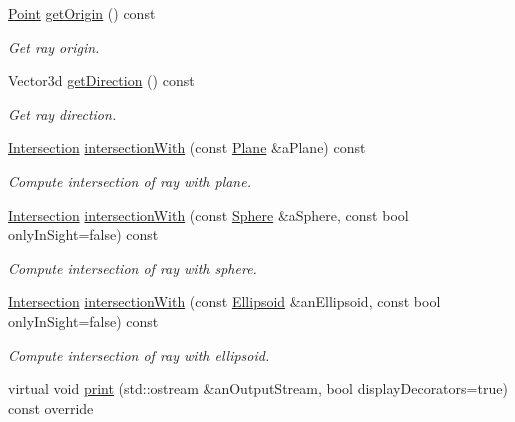 \begin{DoxyCompactItemize}
\hyperlink{classostk_1_1math_1_1geom_1_1d3_1_1objects_1_1_point}{Point} \hyperlink{classostk_1_1math_1_1geom_1_1d3_1_1objects_1_1_ray_a8c47fac4d487986b538b8168484527c2}{get\+Origin} () const
\begin{DoxyCompactList}\small\item\em Get ray origin. \end{DoxyCompactList}\item 
Vector3d \hyperlink{classostk_1_1math_1_1geom_1_1d3_1_1objects_1_1_ray_a986aa3d13740b411f72115503b1c9a72}{get\+Direction} () const
\begin{DoxyCompactList}\small\item\em Get ray direction. \end{DoxyCompactList}\item 
\hyperlink{classostk_1_1math_1_1geom_1_1d3_1_1_intersection}{Intersection} \hyperlink{classostk_1_1math_1_1geom_1_1d3_1_1objects_1_1_ray_aa4625c2dfe200ab9df245d2a4dc92f64}{intersection\+With} (const \hyperlink{classostk_1_1math_1_1geom_1_1d3_1_1objects_1_1_plane}{Plane} \&a\+Plane) const
\begin{DoxyCompactList}\small\item\em Compute intersection of ray with plane. \end{DoxyCompactList}\item 
\hyperlink{classostk_1_1math_1_1geom_1_1d3_1_1_intersection}{Intersection} \hyperlink{classostk_1_1math_1_1geom_1_1d3_1_1objects_1_1_ray_a41019b87b1221c265ce11974e6ddf7be}{intersection\+With} (const \hyperlink{classostk_1_1math_1_1geom_1_1d3_1_1objects_1_1_sphere}{Sphere} \&a\+Sphere, const bool only\+In\+Sight=false) const
\begin{DoxyCompactList}\small\item\em Compute intersection of ray with sphere. \end{DoxyCompactList}\item 
\hyperlink{classostk_1_1math_1_1geom_1_1d3_1_1_intersection}{Intersection} \hyperlink{classostk_1_1math_1_1geom_1_1d3_1_1objects_1_1_ray_a6a8188c91b338f2c591863cac55af126}{intersection\+With} (const \hyperlink{classostk_1_1math_1_1geom_1_1d3_1_1objects_1_1_ellipsoid}{Ellipsoid} \&an\+Ellipsoid, const bool only\+In\+Sight=false) const
\begin{DoxyCompactList}\small\item\em Compute intersection of ray with ellipsoid. \end{DoxyCompactList}\item 
virtual void \hyperlink{classostk_1_1math_1_1geom_1_1d3_1_1objects_1_1_ray_af2aed02d301de6d224cc757b7db573a7}{print} (std\+::ostream \&an\+Output\+Stream, bool display\+Decorators=true) const override

\end{DoxyCompactItemize}
